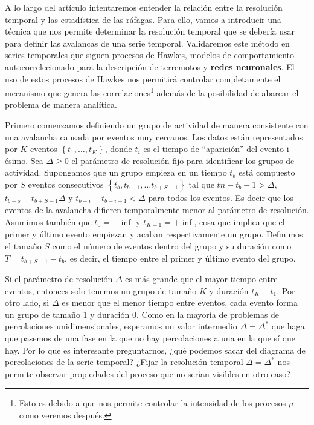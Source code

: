 \documentclass[a4paper,11pt]{book}
\begin{document}
A lo largo del artículo intentaremos entender la relación entre la resolución temporal y las estadística de las ráfagas. Para ello, vamos a introducir una 
técnica que nos permite determinar la resolución temporal que se debería usar para definir las avalancas de una serie temporal. Validaremos este método en 
series temporales que siguen procesos de Hawkes, modelos de comportamiento autocorrelecionado para la descripción de terremotos y \textbf{redes neuronales}.
El uso de estos procesos de Hawkes nos permitirá controlar completamente el mecanismo que genera las correlaciones\footnote{Esto es debido a que nos permite 
controlar la intensidad de los procesos $\mu$ como veremos después.} además de la posibilidad de abarcar el problema de manera analítica.

Primero comenzamos definiendo un grupo de actividad de manera consistente con una avalancha causada por eventos muy cercanos. Los datos están representados 
por $K$ eventos $\left\{ t_1,\ldots,t_K \right\}$, donde $t_i$ es el tiempo de ``aparición'' del evento i-ésimo. Sea $\Delta\geq0$ el parámetro de resolución 
fijo para identificar los grupos de actividad. Supongamos que un grupo empieza en un tiempo $t_b$ está compuesto por $S$ eventos consecutivos 
$\left\{ t_b,t_{b+1},\ldots t_{b+S-1} \right\}$ tal que $tn-t_b-1>\Delta$, $t_{b+s}-t_{b+S-1}\Delta$ y $t_{b+i}-t_{b+i-1}<\Delta$ para todos los eventos. 
Es decir que los eventos de la avalancha difieren temporalmente menor al parámetro de resolución. Asumimos también que $t_0=-\inf$ y $t_{K+1}=+\inf$, cosa que
implica que el primer y último evento empiezan y acaban respectivamente un grupo. Definimos el tamaño $S$ como el número de eventos dentro del grupo y su duración
como $T=t_{b+S-1}-t_b$, es decir, el tiempo entre el primer y último evento del grupo.

Si el parámetro de resolución $\Delta$ es más grande que el mayor tiempo entre eventos, entonces solo tenemos un grupo de tamaño $K$ y duración $t_K-t_1$. 
Por otro lado, si $\Delta$ es menor que el menor tiempo entre eventos, cada evento forma un grupo de tamaño 1 y duración 0. Como en la mayoría de problemas de 
percolaciones unidimensionales, esperamos un valor intermedio $\Delta=\Delta^*$ que haga que pasemos de una fase en la que no hay percolaciones a una en la 
que sí que hay. Por lo que es interesante preguntarnos, ¿qué podemos sacar del diagrama de percolaciones de la serie temporal? ¿Fijar la resolución temporal
$\Delta=\Delta^*$ nos permite observar propiedades del proceso que no serían visibles en otro caso?
\end{document}

